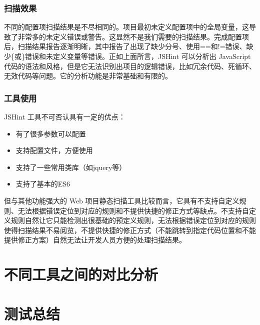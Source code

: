 \documentclass[hyperref, a4paper]{ctexart}
\providecommand{\tightlist}{%
  \setlength{\itemsep}{0pt}\setlength{\parskip}{0pt}}
\begin{document}
\hypertarget{ux626bux63cfux6548ux679c-1}{%
\subsubsection{扫描效果}\label{ux626bux63cfux6548ux679c-1}}

不同的配置项扫描结果是不尽相同的。项目最初未定义配置项中的全局变量，这导致了非常多的未定义错误或警告。这显然不是我们需要的扫描结果。完成配置项后，扫描结果报告逐渐明晰，其中报告了出现了缺少分号、使用==和!=错误、缺少\{或\}错误和未定义变量等错误。正如上面所言，JSHint
可以分析出 JavaScript
代码的语法和风格，但是它无法识别出项目的逻辑错误，比如冗余代码、死循环、无效代码等问题。它的分析功能是非常基础和有限的。

\hypertarget{ux5de5ux5177ux4f7fux7528}{%
\subsubsection{工具使用}\label{ux5de5ux5177ux4f7fux7528}}

JSHint 工具不可否认具有一定的优点：

\begin{itemize}
\tightlist
\item
  有了很多参数可以配置
\item
  支持配置文件，方便使用
\item
  支持了一些常用类库（如jquery等）
\item
  支持了基本的ES6
\end{itemize}

但与其他功能强大的 Web
项目静态扫描工具比较而言，它具有不支持自定义规则、无法根据错误定位到对应的规则和不提供快捷的修正方式等缺点。不支持自定义规则自然让它只能检测出很基础的预定义规则，无法根据错误定位到对应的规则使得扫描结果不易阅览，不提供快捷的修正方式（不能跳转到指定代码位置和不能提供修正方案）自然无法让开发人员方便的处理扫描结果。

\hypertarget{ux4e0dux540cux5de5ux5177ux4e4bux95f4ux7684ux5bf9ux6bd4ux5206ux6790}{%
\section{不同工具之间的对比分析}\label{ux4e0dux540cux5de5ux5177ux4e4bux95f4ux7684ux5bf9ux6bd4ux5206ux6790}}

\hypertarget{ux6d4bux8bd5ux603bux7ed3}{%
\section{测试总结}\label{ux6d4bux8bd5ux603bux7ed3}}
\end{document}
